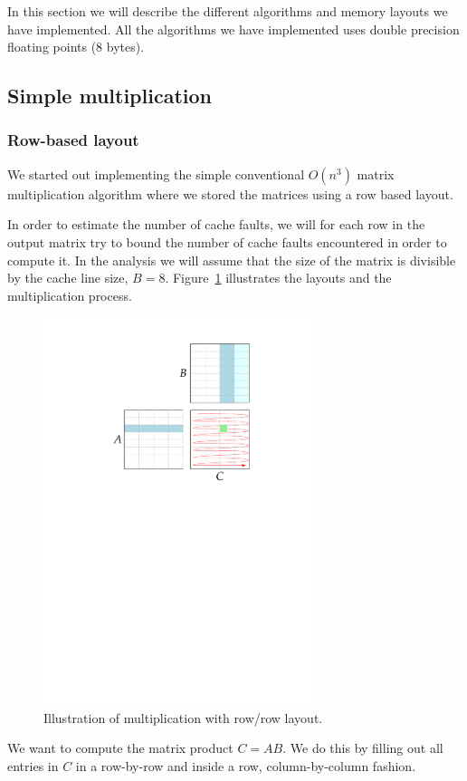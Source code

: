 In this section we will describe the different algorithms and memory
layouts we have implemented. All the algorithms we have implemented uses double precision floating points (8 bytes).

\subsection{Simple multiplication}

\subsubsection{Row-based layout}
We started out implementing the simple conventional $O(n^3)$ matrix
multiplication algorithm where we stored the matrices using a row
based layout.

In order to estimate the number of cache faults, we will for each row
in the output matrix try to bound the number of cache faults
encountered in order to compute it. In the analysis we will assume
that the size of the matrix is divisible by the cache line size, $B =
8$. Figure~\ref{fig:rowrowmul} illustrates the layouts and the
multiplication process.
\begin{figure}[h!]
  \centering
  \includegraphics[width=8cm]{images/rowrowmul}
  \caption{Illustration of multiplication with row/row layout.}
  \label{fig:rowrowmul}
\end{figure}

We want to compute the matrix product $C = AB$. We do this by filling
out all entries in $C$ in a row-by-row and inside a row,
column-by-column fashion. 

